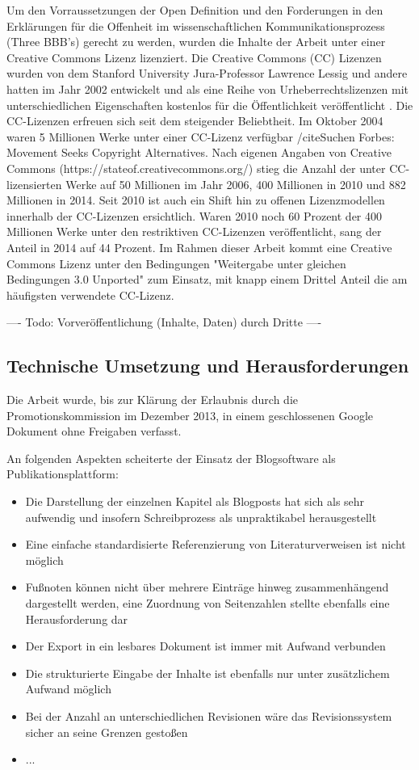 Um den Vorraussetzungen der Open Definition und den Forderungen in den Erklärungen für die Offenheit im wissenschaftlichen Kommunikationsprozess (Three BBB's) gerecht zu werden, wurden die Inhalte der Arbeit unter einer Creative Commons Lizenz lizenziert. Die Creative Commons (CC) Lizenzen wurden von dem Stanford University Jura-Professor Lawrence Lessig und andere hatten im Jahr 2002 entwickelt und als eine Reihe von Urheberrechtslizenzen mit unterschiedlichen Eigenschaften kostenlos für die Öffentlichkeit veröffentlicht \cite{Minjeong_2007}. Die CC-Lizenzen erfreuen sich seit dem steigender Beliebtheit. Im Oktober 2004 waren 5 Millionen Werke unter einer CC-Lizenz verfügbar /cite{Suchen Forbes: Movement Seeks Copyright Alternatives}. Nach eigenen Angaben von Creative Commons (https://stateof.creativecommons.org/) stieg die Anzahl der unter CC-lizensierten Werke auf 50 Millionen im Jahr 2006, 400 Millionen in 2010 und 882 Millionen in 2014. Seit 2010 ist auch ein Shift hin zu offenen Lizenzmodellen innerhalb der CC-Lizenzen ersichtlich. Waren 2010 noch 60 Prozent der 400 Millionen Werke unter den restriktiven CC-Lizenzen veröffentlicht, sang der Anteil in 2014 auf 44 Prozent. Im Rahmen dieser Arbeit kommt eine Creative Commons Lizenz unter den Bedingungen "Weitergabe unter gleichen Bedingungen 3.0 Unported" zum Einsatz, mit knapp einem Drittel Anteil die am häufigsten verwendete CC-Lizenz.

---- Todo: Vorveröffentlichung (Inhalte, Daten) durch Dritte ----

\subsection{Technische Umsetzung und Herausforderungen}

Die Arbeit wurde, bis zur Klärung der Erlaubnis durch die Promotionskommission im Dezember 2013, in einem geschlossenen Google Dokument ohne Freigaben verfasst.

An folgenden Aspekten scheiterte der Einsatz der Blogsoftware als Publikationsplattform:
\begin{itemize}
\item Die Darstellung der einzelnen Kapitel als Blogposts hat sich als sehr aufwendig und insofern Schreibprozess als unpraktikabel herausgestellt
\item Eine einfache standardisierte Referenzierung von Literaturverweisen ist nicht möglich
\item Fußnoten können nicht über mehrere Einträge hinweg zusammenhängend dargestellt werden, eine Zuordnung von Seitenzahlen stellte ebenfalls eine Herausforderung dar
\item Der Export in ein lesbares Dokument ist immer mit Aufwand verbunden
\item Die strukturierte Eingabe der Inhalte ist ebenfalls nur unter zusätzlichem Aufwand möglich
\item Bei der Anzahl an unterschiedlichen Revisionen wäre das Revisionssystem sicher an seine Grenzen gestoßen
\item ...
\end{itemize}

